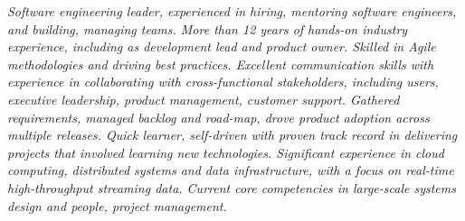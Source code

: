 {\selectfont
	\begin{justify}\textit{Software engineering leader, experienced in hiring, mentoring software engineers, and building, managing teams. More than 12 years of hands-on industry experience, including as development lead and product owner. Skilled in Agile methodologies and driving best practices. Excellent communication skills with experience in collaborating with cross-functional stakeholders, including users, executive leadership, product management, customer support. Gathered requirements, managed backlog and road-map, drove product adoption across multiple releases. Quick learner, self-driven with proven track record in delivering projects that involved learning new technologies. Significant experience in cloud computing, distributed systems and data infrastructure, with a focus on real-time high-throughput streaming data. Current core competencies in large-scale systems design and people, project management.}\end{justify}
}